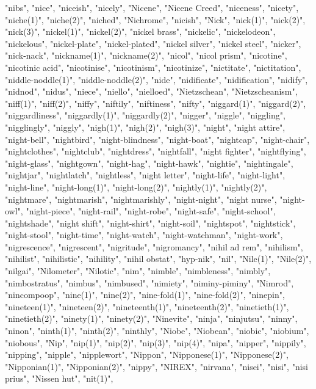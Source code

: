 "nibs",
"nice",
"niceish",
"nicely",
"Nicene",
"Nicene Creed",
"niceness",
"nicety",
"niche(1)",
"niche(2)",
"niched",
"Nichrome",
"nicish",
"Nick",
"nick(1)",
"nick(2)",
"nick(3)",
"nickel(1)",
"nickel(2)",
"nickel brass",
"nickelic",
"nickelodeon",
"nickelous",
"nickel-plate",
"nickel-plated",
"nickel silver",
"nickel steel",
"nicker",
"nick-nack",
"nickname(1)",
"nickname(2)",
"nicol",
"nicol prism",
"nicotine",
"nicotinic acid",
"nicotinise",
"nicotinism",
"nicotinize",
"nictitate",
"nictitation",
"niddle-noddle(1)",
"niddle-noddle(2)",
"nide",
"nidificate",
"nidification",
"nidify",
"nidnod",
"nidus",
"niece",
"niello",
"nielloed",
"Nietzschean",
"Nietzscheanism",
"niff(1)",
"niff(2)",
"niffy",
"niftily",
"niftiness",
"nifty",
"niggard(1)",
"niggard(2)",
"niggardliness",
"niggardly(1)",
"niggardly(2)",
"nigger",
"niggle",
"niggling",
"nigglingly",
"niggly",
"nigh(1)",
"nigh(2)",
"nigh(3)",
"night",
"night attire",
"night-bell",
"nightbird",
"night-blindness",
"night-boat",
"nightcap",
"night-chair",
"nightclothes",
"nightclub",
"nightdress",
"nightfall",
"night fighter",
"nightflying",
"night-glass",
"nightgown",
"night-hag",
"night-hawk",
"nightie",
"nightingale",
"nightjar",
"nightlatch",
"nightless",
"night letter",
"night-life",
"night-light",
"night-line",
"night-long(1)",
"night-long(2)",
"nightly(1)",
"nightly(2)",
"nightmare",
"nightmarish",
"nightmarishly",
"night-night",
"night nurse",
"night-owl",
"night-piece",
"night-rail",
"night-robe",
"night-safe",
"night-school",
"nightshade",
"night shift",
"night-shirt",
"night-soil",
"nightspot",
"nightstick",
"night-stool",
"night-time",
"night-watch",
"night-watchman",
"night-work",
"nigrescence",
"nigrescent",
"nigritude",
"nigromancy",
"nihil ad rem",
"nihilism",
"nihilist",
"nihilistic",
"nihility",
"nihil obstat",
"hyp-nik",
"nil",
"Nile(1)",
"Nile(2)",
"nilgai",
"Nilometer",
"Nilotic",
"nim",
"nimble",
"nimbleness",
"nimbly",
"nimbostratus",
"nimbus",
"nimbused",
"nimiety",
"niminy-piminy",
"Nimrod",
"nincompoop",
"nine(1)",
"nine(2)",
"nine-fold(1)",
"nine-fold(2)",
"ninepin",
"nineteen(1)",
"nineteen(2)",
"nineteenth(1)",
"nineteenth(2)",
"ninetieth(1)",
"ninetieth(2)",
"ninety(1)",
"ninety(2)",
"Ninevite",
"ninja",
"ninjutsu",
"ninny",
"ninon",
"ninth(1)",
"ninth(2)",
"ninthly",
"Niobe",
"Niobean",
"niobic",
"niobium",
"niobous",
"Nip",
"nip(1)",
"nip(2)",
"nip(3)",
"nip(4)",
"nipa",
"nipper",
"nippily",
"nipping",
"nipple",
"nipplewort",
"Nippon",
"Nipponese(1)",
"Nipponese(2)",
"Nipponian(1)",
"Nipponian(2)",
"nippy",
"NIREX",
"nirvana",
"nisei",
"nisi",
"nisi prius",
"Nissen hut",
"nit(1)",
